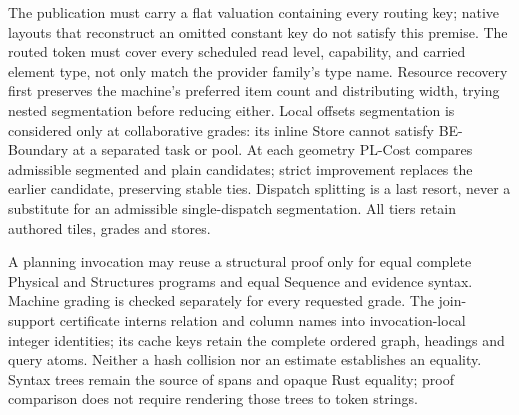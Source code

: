 The publication must carry a flat valuation containing every routing key;
native layouts that reconstruct an omitted constant key do not satisfy this
premise. The routed token must cover every scheduled read level, capability,
and carried element type, not only match the provider family's type name.
Resource recovery first preserves the machine's preferred item count and
distributing width, trying nested segmentation before reducing either.
Local offsets segmentation is considered only at collaborative grades:
its inline Store cannot satisfy BE-Boundary at a separated task or pool.
At each geometry PL-Cost compares admissible segmented and plain candidates;
strict improvement replaces the earlier candidate, preserving stable ties.
Dispatch splitting is a last resort, never a substitute for an admissible
single-dispatch segmentation. All tiers retain authored tiles, grades and stores.

A planning invocation may reuse a structural proof only for equal complete
Physical and Structures programs and equal Sequence and evidence syntax. Machine grading is
checked separately for every requested grade. The join-support certificate
interns relation and column names into invocation-local integer identities;
its cache keys retain the complete ordered graph, headings and query atoms.
Neither a hash collision nor an estimate establishes an equality. Syntax trees
remain the source of spans and opaque Rust equality; proof comparison does
not require rendering those trees to token strings.

